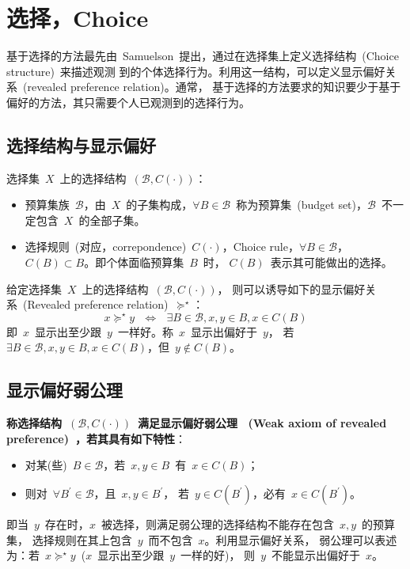 \documentclass[a4paper,12pt]{article}
\begin{document}
\section{选择，Choice }

基于选择的方法最先由~Samuelson~提出，通过在选择集上定义选择结构~(Choice structure)~来描述观测
到的个体选择行为。利用这一结构，可以定义显示偏好关系~(revealed preference relation)。通常，
基于选择的方法要求的知识要少于基于偏好的方法，其只需要个人已观测到的选择行为。

\subsection{选择结构与显示偏好}

选择集~$X$~上的选择结构~$(\mathcal{B},C(\cdot))$：
\begin{itemize}
  \item 预算集族~$\mathcal{B}$，由~$X$~的子集构成，$\forall B\in
        \mathcal{B}$~称为预算集~(budget set)，$\mathcal{B}$~不一定包含~$X$~的全部子集。
  \item 选择规则~(对应，correpondence)~$C(\cdot)$，Choice rule，$\forall B\in
        \mathcal{B}$，$C(B)\subset B$。即个体面临预算集~$B$~时，
        $C(B)$~表示其可能做出的选择。
\end{itemize}

给定选择集~$X$~上的选择结构~$(\mathcal{B},C(\cdot))$，
则可以诱导如下的显示偏好关系~(Revealed preference relation)~$\succeq^\star$：
\begin{equation*}
    x\succeq^\star y~~~\Leftrightarrow~~~\exists B\in\mathcal{B}, x,y\in B, x\in C(B)
\end{equation*}
即~$x$~显示出至少跟~$y$~一样好。称~$x$~显示出偏好于~$y$，
若~$\exists B\in\mathcal{B}, x,y\in B, x\in C(B)$，但~$y\notin C(B)$。


\subsection{显示偏好弱公理}

\textbf{称选择结构~$(\mathcal{B},C(\cdot))$~满足显示偏好弱公理~
(Weak axiom of revealed preference)~，若其具有如下特性}：
\begin{itemize}
  \item 对某(些)~$B\in\mathcal{B}$，若~$x,y\in B$~有~$x\in C(B)$；
  \item 则对~$\forall B^\prime\in\mathcal{B}$，且~$x,y\in B^\prime$，
        若~$y\in C(B^\prime)$，必有~$x\in C(B^\prime)$。
\end{itemize}
即当~$y$~存在时，$x$~被选择，则满足弱公理的选择结构不能存在包含~$x,y$~的预算集，
选择规则在其上包含~$y$~而不包含~$x$。利用显示偏好关系，
弱公理可以表述为：若~$x\succeq^\star y$~($x$~显示出至少跟~$y$~一样的好)，
则~$y$~不能显示出偏好于~$x$。
\end{document}
